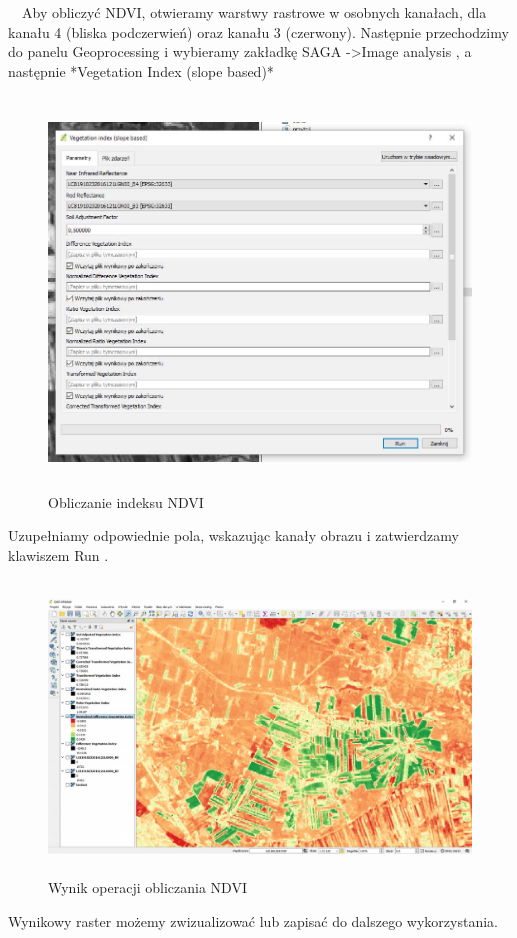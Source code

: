 \documentclass[12pt,a4paper]{book}
\begin{document}
\ \ Aby obliczyć NDVI, otwieramy warstwy rastrowe w osobnych kanałach, dla kanału 4 (bliska podczerwień) oraz kanału 3 (czerwony). Następnie przechodzimy do panelu  Geoprocessing  i wybieramy zakładkę  SAGA -{\textgreater}Image analysis , a następnie *Vegetation Index (slope based)*



\begin{center}
\begin{figure}
\includegraphics[width=13cm,height=10.389cm]{004-saga-ndvi.jpg}
\caption{Obliczanie indeksu NDVI}
\end{figure}
\end{center}
Uzupełniamy odpowiednie pola, wskazując kanały obrazu i zatwierdzamy klawiszem  Run .



\begin{center}
\begin{figure}
\includegraphics[width=13cm,height=7.786cm]{004-saga-grafika.jpg}
\caption{Wynik operacji obliczania NDVI}
\end{figure}
\end{center}
Wynikowy raster możemy zwizualizować lub zapisać do dalszego wykorzystania.
\end{document}

